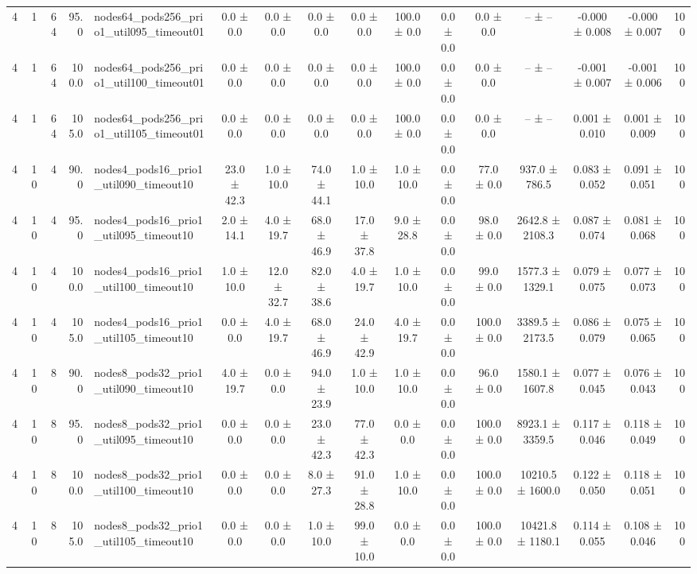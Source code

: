 \begin{tabular}{r r r r l c c c c c c c c c c r}
4 & 1 & 64 & 95.0 & nodes64\_pods256\_prio1\_util095\_timeout01 & 0.0 ± 0.0 & 0.0 ± 0.0 & 0.0 ± 0.0 & 0.0 ± 0.0 & 100.0 ± 0.0 & 0.0 ± 0.0 & 0.0 ± 0.0 & -- ± -- & -0.000 ± 0.008 & -0.000 ± 0.007 & 100 \\
4 & 1 & 64 & 100.0 & nodes64\_pods256\_prio1\_util100\_timeout01 & 0.0 ± 0.0 & 0.0 ± 0.0 & 0.0 ± 0.0 & 0.0 ± 0.0 & 100.0 ± 0.0 & 0.0 ± 0.0 & 0.0 ± 0.0 & -- ± -- & -0.001 ± 0.007 & -0.001 ± 0.006 & 100 \\
4 & 1 & 64 & 105.0 & nodes64\_pods256\_prio1\_util105\_timeout01 & 0.0 ± 0.0 & 0.0 ± 0.0 & 0.0 ± 0.0 & 0.0 ± 0.0 & 100.0 ± 0.0 & 0.0 ± 0.0 & 0.0 ± 0.0 & -- ± -- & 0.001 ± 0.010 & 0.001 ± 0.009 & 100 \\
4 & 10 & 4 & 90.0 & nodes4\_pods16\_prio1\_util090\_timeout10 & 23.0 ± 42.3 & 1.0 ± 10.0 & 74.0 ± 44.1 & 1.0 ± 10.0 & 1.0 ± 10.0 & 0.0 ± 0.0 & 77.0 ± 0.0 & 937.0 ± 786.5 & 0.083 ± 0.052 & 0.091 ± 0.051 & 100 \\
4 & 10 & 4 & 95.0 & nodes4\_pods16\_prio1\_util095\_timeout10 & 2.0 ± 14.1 & 4.0 ± 19.7 & 68.0 ± 46.9 & 17.0 ± 37.8 & 9.0 ± 28.8 & 0.0 ± 0.0 & 98.0 ± 0.0 & 2642.8 ± 2108.3 & 0.087 ± 0.074 & 0.081 ± 0.068 & 100 \\
4 & 10 & 4 & 100.0 & nodes4\_pods16\_prio1\_util100\_timeout10 & 1.0 ± 10.0 & 12.0 ± 32.7 & 82.0 ± 38.6 & 4.0 ± 19.7 & 1.0 ± 10.0 & 0.0 ± 0.0 & 99.0 ± 0.0 & 1577.3 ± 1329.1 & 0.079 ± 0.075 & 0.077 ± 0.073 & 100 \\
4 & 10 & 4 & 105.0 & nodes4\_pods16\_prio1\_util105\_timeout10 & 0.0 ± 0.0 & 4.0 ± 19.7 & 68.0 ± 46.9 & 24.0 ± 42.9 & 4.0 ± 19.7 & 0.0 ± 0.0 & 100.0 ± 0.0 & 3389.5 ± 2173.5 & 0.086 ± 0.079 & 0.075 ± 0.065 & 100 \\
4 & 10 & 8 & 90.0 & nodes8\_pods32\_prio1\_util090\_timeout10 & 4.0 ± 19.7 & 0.0 ± 0.0 & 94.0 ± 23.9 & 1.0 ± 10.0 & 1.0 ± 10.0 & 0.0 ± 0.0 & 96.0 ± 0.0 & 1580.1 ± 1607.8 & 0.077 ± 0.045 & 0.076 ± 0.043 & 100 \\
4 & 10 & 8 & 95.0 & nodes8\_pods32\_prio1\_util095\_timeout10 & 0.0 ± 0.0 & 0.0 ± 0.0 & 23.0 ± 42.3 & 77.0 ± 42.3 & 0.0 ± 0.0 & 0.0 ± 0.0 & 100.0 ± 0.0 & 8923.1 ± 3359.5 & 0.117 ± 0.046 & 0.118 ± 0.049 & 100 \\
4 & 10 & 8 & 100.0 & nodes8\_pods32\_prio1\_util100\_timeout10 & 0.0 ± 0.0 & 0.0 ± 0.0 & 8.0 ± 27.3 & 91.0 ± 28.8 & 1.0 ± 10.0 & 0.0 ± 0.0 & 100.0 ± 0.0 & 10210.5 ± 1600.0 & 0.122 ± 0.050 & 0.118 ± 0.051 & 100 \\
4 & 10 & 8 & 105.0 & nodes8\_pods32\_prio1\_util105\_timeout10 & 0.0 ± 0.0 & 0.0 ± 0.0 & 1.0 ± 10.0 & 99.0 ± 10.0 & 0.0 ± 0.0 & 0.0 ± 0.0 & 100.0 ± 0.0 & 10421.8 ± 1180.1 & 0.114 ± 0.055 & 0.108 ± 0.046 & 100 \\

\end{tabular}
